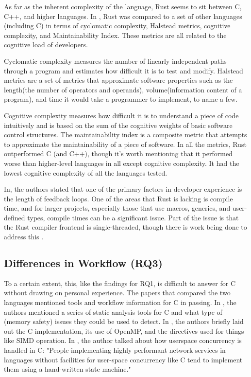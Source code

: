 \documentclass[conference]{IEEEtran}
\begin{document}

As far as the inherent complexity of the language, Rust seems to sit between C, C++, and higher languages. In \cite{arditoEvaluationRustCode2021}, Rust was compared to a set of other languages (including C) in terms of cyclomatic complexity, Halstead metrics, cognitive complexity, and Maintainability Index. These metrics are all related to the cognitive load of developers.

Cyclomatic complexity measures the number of linearly independent paths through a program and estimates how difficult it is to test and modify. Halstead metrics are a set of metrics that approximate software properties such as the length(the number of operators and operands), volume(information content of a program), and time it would take a programmer to implement, to name a few.

Cognitive complexity measures how difficult it is to understand a piece of code intuitively and is based on the sum of the cognitive weights of basic software control structures. The maintainability index is a composite metric that attempts to approximate the maintainability of a piece of software. In all the metrics, Rust outperformed C (and C++), though it's worth mentioning that it performed worse than higher-level languages in all except cognitive complexity. It had the lowest cognitive complexity of all the languages tested.

In\cite{nodaDevExWhatActually2023}, the authors stated that one of the primary factors in developer experience is the length of feedback loops. One of the areas that Rust is lacking is compile time, and for larger projects, especially those that use macros, generics, and user-defined types, compile times can be a significant issue. Part of the issue is that the Rust compiler frontend is single-threaded, though there is work being done to address this \cite{TrackingIssueParallel}.

\subsection{Differences in Workflow (RQ3)}

To a certain extent, this, like the findings for RQ1, is difficult to answer for C without drawing on personal experience. The papers that compared the two languages mentioned tools and workflow information for C in passing. In \cite{nosedaRustSecureIoT2022}, the authors mentioned a series of static analysis tools for C and what type of (memory safety) issues they could be used to detect. In \cite{costanzoPerformanceVsProgramming2021}, the authors briefly laid out the C implementation, its use of OpenMP, and the directives used for things like SIMD operation. In \cite{saoirseWhyAsyncRust2023}, the author talked about how userspace
concurrency is handled in C: "People implementing highly performant network services in languages without facilities for user-space concurrency like C tend to implement them using a hand-written state machine."
\end{document}
